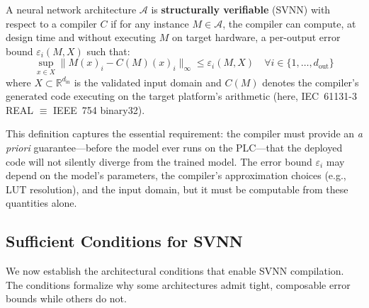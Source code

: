 \begin{definition}
\label{def:svnn}
A neural network architecture $\mathcal{A}$ is \textbf{structurally
verifiable} (SVNN) with respect to a compiler $C$ if for any instance
$M \in \mathcal{A}$, the compiler can compute, at design time and without
executing $M$ on target hardware, a per-output error bound
$\varepsilon_i(M, X)$ such that:
\begin{equation}
\sup_{x \in X} \|M(x)_i - C(M)(x)_i\|_\infty \leq \varepsilon_i(M, X)
\quad \forall i \in \{1, \dots, d_{\text{out}}\}
\label{eq:svnn_def}
\end{equation}
where $X \subset \mathbb{R}^{d_{\text{in}}}$ is the validated input domain
and $C(M)$ denotes the compiler's generated code executing on the target
platform's arithmetic (here, IEC~61131-3 REAL $\equiv$ IEEE~754 binary32).
\end{definition}

This definition captures the essential requirement: the compiler must
provide an \textit{a priori} guarantee---before the model ever runs on the
PLC---that the deployed code will not silently diverge from the trained
model. The error bound $\varepsilon_i$ may depend on the model's parameters,
the compiler's approximation choices (e.g., LUT resolution), and the input
domain, but it must be computable from these quantities alone.

\subsection{Sufficient Conditions for SVNN}
\label{sec:svnn-conditions}

We now establish the architectural conditions that enable SVNN compilation.
The conditions formalize why some architectures admit tight, composable
error bounds while others do not.

